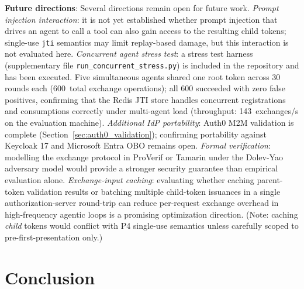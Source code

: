 \documentclass[journal]{IEEEtran}
\theoremstyle{definition}
\begin{document}
\textbf{Future directions}:
Several directions remain open for future work.
\textit{Prompt injection interaction}: it is not yet established whether prompt
injection that drives an agent to call a tool can also gain access to the
resulting child tokens; single-use \texttt{jti} semantics may limit
replay-based damage, but this interaction is not evaluated here.
\textit{Concurrent agent stress test}: a stress test harness
(supplementary file \texttt{run\_concurrent\_\allowbreak stress.py}) is included in the
repository and has been executed. Five simultaneous agents shared one root
token across 30 rounds each (600~total exchange operations); all 600
succeeded with zero false positives, confirming that the Redis JTI store
handles concurrent registrations and consumptions correctly under multi-agent
load (throughput: 143~exchanges/s on the evaluation machine).
\textit{Additional IdP portability}: Auth0 M2M validation is complete
(Section~\ref{sec:auth0_validation}); confirming portability against Keycloak 17
and Microsoft Entra OBO remains open.
\textit{Formal verification}: modelling the exchange protocol in ProVerif
\cite{blanchet2001} or Tamarin \cite{meier2013} under the Dolev-Yao adversary
model would provide a stronger security guarantee than empirical evaluation alone.
\textit{Exchange-input caching}: evaluating whether caching parent-token
validation results or batching multiple child-token issuances in a single
authorization-server round-trip can reduce per-request exchange overhead in
high-frequency agentic loops is a promising optimization direction.  (Note:
caching \textit{child} tokens would conflict with P4 single-use semantics
unless carefully scoped to pre-first-presentation only.)


\FloatBarrier  %

\section{Conclusion}
\label{sec:conclusion}
\end{document}
